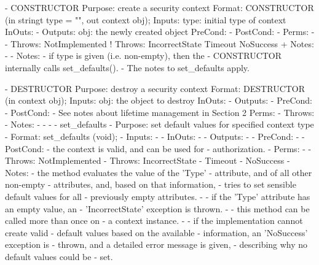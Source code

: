  \begin{myspec}
 
    - CONSTRUCTOR
      Purpose:  create a security context
      Format:   CONSTRUCTOR          (in  stringt type = "",
                                      out context obj);
      Inputs:   type:                 initial type of context
      InOuts:   -
      Outputs:  obj:                  the newly created object
      PreCond:  -
      PostCond: -
      Perms:    -
-     Throws:   NotImplemented
!     Throws:   IncorrectState
                Timeout
                NoSuccess
+     Notes:    - 
-     Notes:    - if type is given (i.e. non-empty), then the
-                 CONSTRUCTOR internally calls set_defaults().
-                 The notes to set_defaults apply.
 
    - DESTRUCTOR
      Purpose:  destroy a security context
      Format:   DESTRUCTOR           (in context obj);
      Inputs:   obj:                  the object to destroy
      InOuts:   -
      Outputs:  -
      PreCond:  -
      PostCond: - See notes about lifetime management 
                  in Section 2
      Perms:    -
      Throws:   -
      Notes:    -
-
-   - set_defaults
-     Purpose:  set default values for specified context type
-     Format:   set_defaults         (void);                 
-     Inputs:   -
-     InOuts:   -
-     Outputs:  -
-     PreCond:  -
-     PostCond: - the context is valid, and can be used for 
-                 authorization.
-     Perms:    -
-     Throws:   NotImplemented
-     Throws:   IncorrectState
-               Timeout
-               NoSuccess
-     Notes:    - the method evaluates the value of the 'Type'
-                 attribute, and of all other non-empty
-                 attributes, and, based on that information, 
-                 tries to set sensible default values for all 
-                 previously empty attributes.
-               - if the 'Type' attribute has an empty value, an
-                 'IncorrectState' exception is thrown.
-               - this method can be called more than once on
-                 a context instance.
-               - if the implementation cannot create valid
-                 default values based on the available
-                 information, an 'NoSuccess' exception is
-                 thrown, and a detailed error message is given,
-                 describing why no default values could be
-                 set.
 \end{myspec}
 
 
